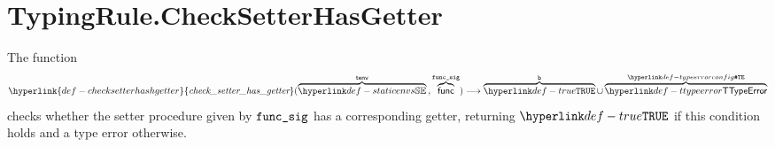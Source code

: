 \documentclass{book}
\newcommand\checksetterhasgetter[0]{\hyperlink{def-checksetterhashgetter}{\textfunc{check\_setter\_has\_getter}}}
\begin{document}


\section{TypingRule.CheckSetterHasGetter \label{sec:TypingRule.CheckSetterHasGetter}}
\hypertarget{def-checksetterhashgetter}{}
The function
\[
  \checksetterhasgetter(\overname{\staticenvs}{\tenv} \aslsep \overname{\func}{\funcsig})
  \aslto \overname{\True}{\vb} \cup \overname{\TTypeError}{\TypeErrorConfig}
\]
checks whether the setter procedure given by $\texttt{func\_sig}$ has a corresponding getter,
returning $\True$ if this condition holds and a type error otherwise.
\end{document}
